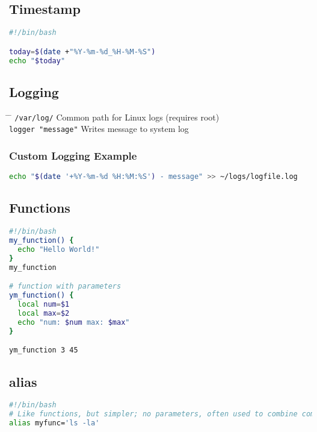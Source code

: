 \documentclass[a4paper,10pt]{article}
\begin{document}
\subsection{Timestamp}
\begin{lstlisting}[language=bash]
#!/bin/bash 

today=$(date +"%Y-%m-%d_%H-%M-%S")
echo "$today"
\end{lstlisting}

\subsection{Logging}
\begin{tabbing}
	\= \hspace{30mm} \= \hspace{50mm} \kill
	\> \verb|/var/log/| \> Common path for Linux logs (requires root) \\
	\> \verb|logger "message"| \> Writes message to system log \\
\end{tabbing}

\subsubsection*{Custom Logging Example}
\begin{lstlisting}[language=bash]
echo "$(date '+%Y-%m-%d %H:%M:%S') - message" >> ~/logs/logfile.log
\end{lstlisting}

\subsection{Functions}
\begin{lstlisting}[language=bash]
#!/bin/bash
my_function() {
  echo "Hello World!"
}
my_function

# function with parameters 
ym_function() {
  local num=$1 
  local max=$2 
  echo "num: $num max: $max"
}

ym_function 3 45
\end{lstlisting}

\subsection{alias}
\begin{lstlisting}[language=bash]
#!/bin/bash
# Like functions, but simpler; no parameters, often used to combine commands
alias myfunc='ls -la'
\end{lstlisting}
\end{document}
